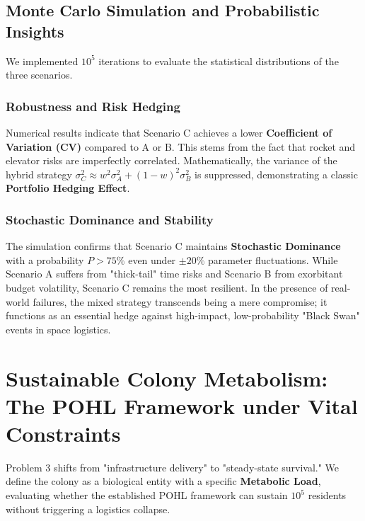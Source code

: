 \documentclass{mcmthesis}
\begin{document}
\subsection{Monte Carlo Simulation and Probabilistic Insights}

We implemented $10^5$ iterations to evaluate the statistical distributions of the three scenarios. 

\subsubsection{Robustness and Risk Hedging}
Numerical results indicate that Scenario C achieves a lower \textbf{Coefficient of Variation (CV)} compared to A or B. This stems from the fact that rocket and elevator risks are imperfectly correlated. Mathematically, the variance of the hybrid strategy $\sigma_{C}^2 \approx w^2 \sigma_{A}^2 + (1-w)^2 \sigma_{B}^2$ is suppressed, demonstrating a classic \textbf{Portfolio Hedging Effect}.

\subsubsection{Stochastic Dominance and Stability}
The simulation confirms that Scenario C maintains \textbf{Stochastic Dominance} with a probability $P > 75\%$ even under $\pm20\%$ parameter fluctuations. While Scenario A suffers from "thick-tail" time risks and Scenario B from exorbitant budget volatility, Scenario C remains the most resilient. In the presence of real-world failures, the mixed strategy transcends being a mere compromise; it functions as an essential hedge against high-impact, low-probability "Black Swan" events in space logistics.
\section{Sustainable Colony Metabolism: The POHL Framework under Vital Constraints}

Problem 3 shifts from "infrastructure delivery" to "steady-state survival." We define the colony as a biological entity with a specific \textbf{Metabolic Load}, evaluating whether the established POHL framework can sustain $10^5$ residents without triggering a logistics collapse.
\end{document}
